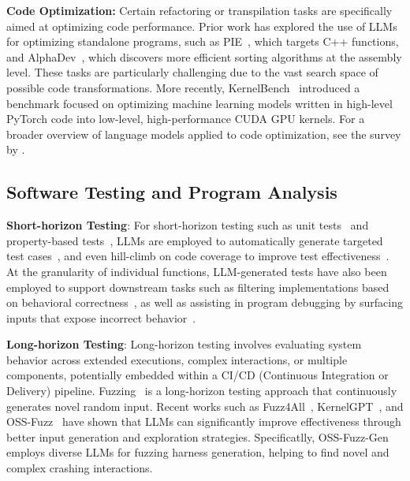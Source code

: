 % 
% 


\textbf{Code Optimization:}
Certain refactoring or transpilation tasks are specifically aimed at optimizing code performance. 
Prior work has explored the use of LLMs for optimizing standalone programs, such as PIE~\citep{pie}, which targets C++ functions, and AlphaDev~\citep{alphadev}, which discovers more efficient sorting algorithms at the assembly level. 
These tasks are particularly challenging due to the vast search space of possible code transformations. 
More recently, KernelBench~\citep{ouyang2024kernelbench} introduced a benchmark focused on optimizing machine learning models written in high-level PyTorch code into low-level, high-performance CUDA GPU kernels. 
For a broader overview of language models applied to code optimization, see the survey by \citet{gong2025language}.

% 




\subsection{Software Testing and Program Analysis}
\label{sec:related-software-testing-and-program-analysis}

\textbf{Short-horizon Testing}:
For short-horizon testing such as unit tests~\citep{lemieux2023codamosa} and property-based tests~\citep{vikram2023can}, 
LLMs are employed to automatically generate targeted test cases~\citep{li2024largelanguagemodelstest, mundler2025swt}, and even hill-climb on code coverage to improve test effectiveness~\citep{ryan2024code}. 
At the granularity of individual functions, LLM-generated tests have also been employed to support downstream tasks such as filtering implementations based on behavioral correctness~\citep{chen2022codet, zhang2023algo}, as well as assisting in program debugging by surfacing inputs that expose incorrect behavior~\citep{chen2025revisit}.

\textbf{Long-horizon Testing}:
Long-horizon testing involves evaluating system behavior across extended executions, complex interactions, or multiple components, potentially embedded within a CI/CD (Continuous Integration or Delivery) pipeline.
Fuzzing~\citep{miller1990empirical} is a long-horizon testing approach that continuously generates novel random input. 
Recent works such as Fuzz4All~\citep{xia2024fuzz4all}, KernelGPT~\citep{yang2023kernelgpt}, and OSS-Fuzz~\citep{ossfuzzllm, ossfuzzllm-results} have shown that LLMs can significantly improve effectiveness through better input generation and exploration strategies.
Specificatlly, OSS-Fuzz-Gen~\citep{liu2024ossfuzzgen} employs diverse LLMs for fuzzing harness generation, helping to find novel and complex crashing interactions.

